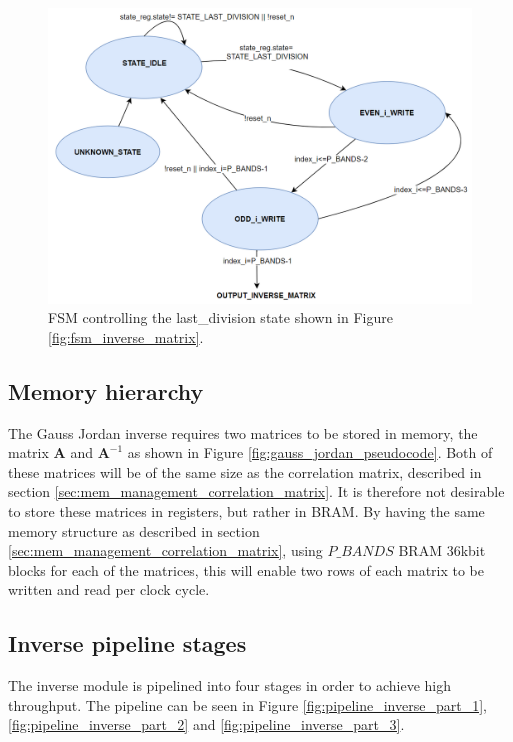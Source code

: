 \begin{figure}[H]
\centering
   \includegraphics[scale=0.5]{images/inverse_hw/fsm_last_division.PNG}
  \caption{FSM controlling the last\_division state shown in Figure \ref{fig:fsm_inverse_matrix}.  } 
  \label{fig:fsm_last_division}
\end{figure}

\subsection{Memory hierarchy}
The Gauss Jordan inverse requires two matrices to be stored in memory, the matrix $\textbf{A}$ and $\textbf{A}^{-1}$ as shown in Figure \ref{fig:gauss_jordan_pseudocode}. Both of these matrices will be of the same size as the correlation matrix, described in section \ref{sec:mem_management_correlation_matrix}. It is therefore not desirable to store these matrices in registers, but rather in BRAM. By having the same memory structure as described in section \ref{sec:mem_management_correlation_matrix}, using $P\_BANDS$ BRAM 36kbit blocks for each of the matrices, this will enable two rows of each matrix to be written and read per clock cycle. 

\subsection{Inverse pipeline stages}
The inverse module is pipelined into four stages in order to achieve high throughput. The pipeline can be seen in Figure \ref{fig:pipeline_inverse_part_1}, \ref{fig:pipeline_inverse_part_2} and \ref{fig:pipeline_inverse_part_3}.

